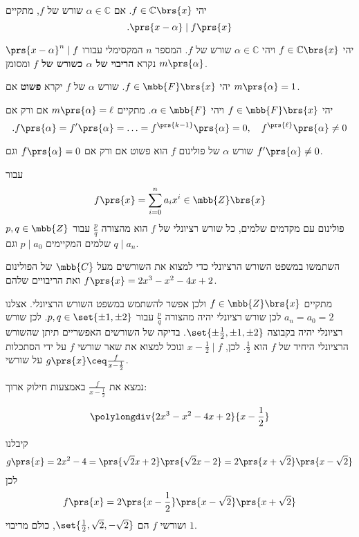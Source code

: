 \documentclass[article, 10pt,oneside]{article}
\renewcommand{\emph}[1]{\textbf{#1}}
\begin{document}
\begin{corollary}
יהי
$f \in \mathbb{C}\brs{x}$.
אם
$\alpha \in \mathbb{C}$
שורש של
$f$,
מתקיים
\[\text{.}\prs{x - \alpha} \mid f\prs{x}\]
\end{corollary}

\begin{definition}
יהי
$f \in \mathbb{C}\brs{x}$
ויהי
$\alpha \in \mathbb{C}$
שורש של
$f$.
המספר
$n$
המקסימלי עבורו
$\prs{x-\alpha}^n \mid f$
נקרא
\emph{
הריבוי של
$\alpha$
כשורש של
$f$
}
ומסומן
$m\prs{\alpha}$.
\end{definition}

\begin{definition}
יהי
$f \in \mbb{F}\brs{x}$.
שורש
$\alpha$
של
$f$
יקרא
\emph{פשוט}
אם
$m\prs{\alpha} = 1$.
\end{definition}

\begin{proposition}
יהי
$f \in \mbb{F}\brs{x}$
ויהי
$\alpha \in \mbb{F}$.
מתקיים
$m\prs{\alpha} = \ell$
אם ורק אם
\[\text{.} f\prs{\alpha} = f'\prs{\alpha} = \ldots = f^{\prs{k-1}}\prs{\alpha} = 0, \quad f^{\prs{\ell}}\prs{\alpha} \neq 0\]
\end{proposition}

\begin{corollary}
שורש
$\alpha$
של פולינום
$f$
הוא פשוט אם ורק אם
$f\prs{\alpha} = 0$
וגם
$f'\prs{\alpha} \neq 0$.
\end{corollary}

\begin{theorem}
עבור
\[f\prs{x} = \sum_{i=0}^n a_i x^i \in \mbb{Z}\brs{x}\]
פולינום עם מקדמים שלמים,
כל שורש רציונלי של
$f$
הוא מהצורה
$\frac{p}{q}$
עבור
$p,q \in \mbb{Z}$
שלמים המקיימים
$p \mid a_0$
וגם
$q \mid a_n$.
\end{theorem}

\begin{exercise}
השתמשו במשפט השורש הרציונלי כדי למצוא את השורשים מעל
$\mbb{C}$
של הפולינום
$f\prs{x} = 2x^3 - x^2 - 4x + 2$
ואת הריבויים שלהם.
\end{exercise}

\begin{solution}
מתקיים
$f \in \mbb{Z}\brs{x}$
ולכן אפשר להשתמש במשפט השורש הרציונלי. אצלנו
$a_n = a_0 = 2$
לכן שורש רציונלי יהיה מהצורה
$\frac{p}{q}$
עבור
$p,q \in \set{\pm 1, \pm 2}$.
לכן שורש רציונלי יהיה בקבוצה
$\set{\pm \frac{1}{2}, \pm 1, \pm 2}$.
בדיקה של השורשים האפשריים תיתן שהשורש הרציונלי היחיד של
$f$
הוא
$\frac{1}{2}$.
לכן,
$x - \frac{1}{2} \mid f$
ונוכל למצוא את שאר שורשי
$f$
על ידי הסתכלות על שורשי
$g\prs{x} \ceq \frac{f}{x-\frac{1}{2}}$.

נמצא את
$\frac{f}{x-\frac{1}{2}}$
באמצעות חילוק ארוך:

\begin{otherlanguage}{english}
\[
\polylongdiv{2x^3 - x^2 - 4x + 2}{x-\frac{1}{2}}
\]
\end{otherlanguage}

קיבלנו
\[g\prs{x} = 2x^2 - 4 = \prs{\sqrt{2}x + 2}\prs{\sqrt{2}x - 2} = 2 \prs{x + \sqrt{2}}\prs{x-\sqrt{2}}\]
לכן
\[f\prs{x} = 2 \prs{x-\frac{1}{2}}\prs{x-\sqrt{2}}\prs{x+\sqrt{2}}\]
ושורשי
$f$
הם
$\set{\frac{1}{2}, \sqrt{2}, -\sqrt{2}}$,
כולם מריבוי
$1$.
\end{solution}
\end{document}
